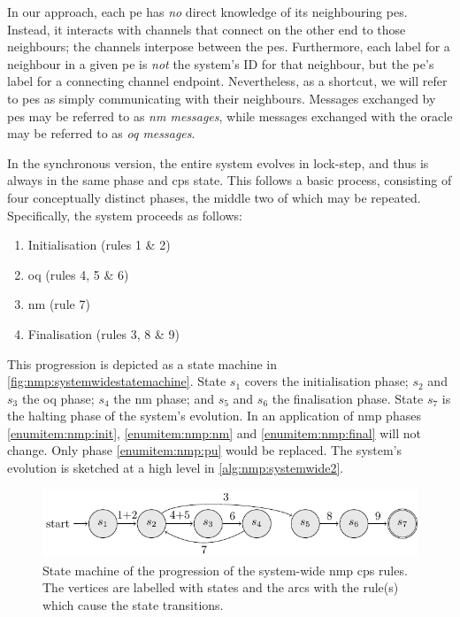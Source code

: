 In our approach, each \gls{pe} has \emph{no} direct knowledge of its neighbouring \glspl{pe}.  Instead, it interacts with channels that connect on the other end to those neighbours; the channels interpose between the \glspl{pe}.  Furthermore, each label for a neighbour in a given \gls{pe} is \emph{not} the system's ID for that neighbour, but the \gls{pe}'s label for a connecting channel endpoint.  Nevertheless, as a shortcut, we will refer to \glspl{pe} as simply communicating with their neighbours.  Messages exchanged by \glspl{pe} may be referred to as \emph{\acrfull{nm} messages}, while messages exchanged with the oracle may be referred to as \emph{\acrfull{oq} messages}.

In the synchronous version, the entire system evolves in lock-step, and thus is always in the same phase and \gls{cps} state.  This follows a basic process, consisting of four conceptually distinct phases, the middle two of which may be repeated.  Specifically, the system proceeds as follows:

\begin{enumerate}
    \item\label{enumitem:nmp:init} Initialisation (rules 1 \& 2)
    \item\label{enumitem:nmp:pu} \Gls{oq} (rules 4, 5 \& 6)
    \item\label{enumitem:nmp:nm} \Gls{nm} (rule 7)
    \item\label{enumitem:nmp:final} Finalisation (rules 3, 8 \& 9)
\end{enumerate}

This progression is depicted as a state machine in \autoref{fig:nmp:systemwidestatemachine}.  State \(s_1\) covers the initialisation phase; \(s_2\) and \(s_3\) the \gls{oq} phase; \(s_4\) the \gls{nm} phase; and \(s_5\) and \(s_6\) the finalisation phase.  State \(s_7\) is the halting phase of the system's evolution.  In an application of \gls{nmp} phases \ref{enumitem:nmp:init}, \ref{enumitem:nmp:nm} and \ref{enumitem:nmp:final} will not change.  Only phase \ref{enumitem:nmp:pu} would be replaced.  The system's evolution is sketched at a high level in \autoref{alg:nmp:systemwide2}.

\begin{figure}
    \centering
    \includegraphics{chapters/nmp/images/systemwidestatemachine.pdf}
    \caption[State machine of the progression of the system-wide \acrlong{nmp} \gls{cps} rules.]{State machine of the progression of the system-wide \gls{nmp} \gls{cps} rules.  The vertices are labelled with states and the arcs with the rule(s) which cause the state transitions.}
    \label{fig:nmp:systemwidestatemachine}
\end{figure}

